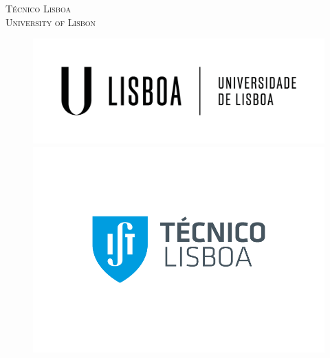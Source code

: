 \documentclass[12pt]{article}
\begin{document}
    \begin{titlepage}
    
    \newcommand{\HRule}{\rule{\linewidth}{0.5mm}} %
    
    \center %
     
    
    \textsc{\LARGE{T\'{e}cnico Lisboa} \\ \vspace{0.5cm} \LARGE{University of Lisbon}}\\[1cm] %
    \vspace{-2cm}
    \begin{figure}[H]
        \centering
        \begin{minipage}{.5\textwidth}
            \centering
            \phantom{............}\includegraphics[width=.9\linewidth]{figures/logos/university-lisbon-logo.png}
        \end{minipage}%
        \begin{minipage}{.5\textwidth}
            \centering
            \hspace{-1cm}
            \includegraphics[width=.9\linewidth]{figures/logos/tecnico-ulisboa-logo.png}

\end{minipage}
\end{figure}
\end{titlepage}
\end{document}
